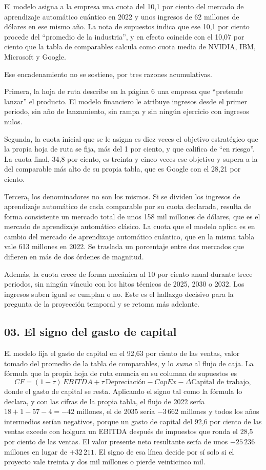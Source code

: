 \documentclass[11pt,letterpaper]{article}
\begin{document}
El modelo asigna a la empresa una cuota del 10,1 por ciento del mercado de
aprendizaje automático cuántico en 2022 y unos ingresos de 62 millones de
dólares en ese mismo año. La nota de supuestos indica que ese 10,1 por ciento
procede del \enquote{promedio de la industria}, y en efecto coincide con el
10,07 por ciento que la tabla de comparables calcula como cuota media de
NVIDIA, IBM, Microsoft y Google.

Ese encadenamiento no se sostiene, por tres razones acumulativas.

Primera, la hoja de ruta describe en la página 6 una empresa que
\enquote{pretende lanzar} el producto. El modelo financiero le atribuye
ingresos desde el primer periodo, sin año de lanzamiento, sin rampa y sin
ningún ejercicio con ingresos nulos.

Segunda, la cuota inicial que se le asigna es diez veces el objetivo
estratégico que la propia hoja de ruta se fija, más del 1 por ciento, y que
califica de \enquote{en riesgo}. La cuota final, 34,8 por ciento, es treinta y
cinco veces ese objetivo y supera a la del comparable más alto de su propia
tabla, que es Google con el 28,21 por ciento.

Tercera, los denominadores no son los mismos. Si se dividen los ingresos de
aprendizaje automático de cada comparable por su cuota declarada, resulta de
forma consistente un mercado total de unos 158 mil millones de dólares, que es
el mercado de aprendizaje automático clásico. La cuota que el modelo aplica es
en cambio del mercado de aprendizaje automático cuántico, que en la misma tabla
vale 613 millones en 2022. Se traslada un porcentaje entre dos mercados que
difieren en más de dos órdenes de magnitud.

Además, la cuota crece de forma mecánica al 10 por ciento anual durante trece
periodos, sin ningún vínculo con los hitos técnicos de 2025, 2030 o 2032. Los
ingresos suben igual se cumplan o no. Este es el hallazgo decisivo para la
pregunta de la proyección temporal y se retoma más adelante.

\subsection*{03. El signo del gasto de capital}

El modelo fija el gasto de capital en el 92,63 por ciento de las ventas, valor
tomado del promedio de la tabla de comparables, y lo \emph{suma} al flujo de
caja. La fórmula que la propia hoja de ruta enuncia en su columna de supuestos
es
\[
  CF = (1-\tau)\,EBITDA + \tau\,\text{Depreciación} - CapEx -
  \Delta\text{Capital de trabajo},
\]
donde el gasto de capital se resta. Aplicando el signo tal como la fórmula lo
declara, y con las cifras de la propia tabla, el flujo de 2022 sería
$18 + 1 - 57 - 4 = -42$ millones, el de 2035 sería $-3\,662$ millones y todos
los años intermedios serían negativos, porque un gasto de capital del 92,6 por
ciento de las ventas excede con holgura un EBITDA después de impuestos que
ronda el 28,5 por ciento de las ventas. El valor presente neto resultante sería
de unos $-25\,236$ millones en lugar de $+32\,211$. El signo de esa línea
decide por sí solo si el proyecto vale treinta y dos mil millones o pierde
veinticinco mil.
\end{document}
